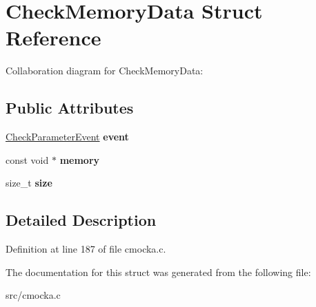 \hypertarget{structCheckMemoryData}{}\section{Check\+Memory\+Data Struct Reference}
\label{structCheckMemoryData}


Collaboration diagram for Check\+Memory\+Data\+:
\subsection*{Public Attributes}
\begin{DoxyCompactItemize}
\item 
\mbox{\label{structCheckMemoryData_afa102f599993f28924b9f73cf9b45990}} 
\hyperlink{structCheckParameterEvent}{Check\+Parameter\+Event} {\bfseries event}
\item 
\mbox{\label{structCheckMemoryData_aac7288cc682bfa7917c6258c56aeb723}} 
const void $\ast$ {\bfseries memory}
\item 
\mbox{\label{structCheckMemoryData_a0015b301a15e7b148e95aa1d6f51cb11}} 
size\+\_\+t {\bfseries size}
\end{DoxyCompactItemize}


\subsection{Detailed Description}


Definition at line 187 of file cmocka.\+c.



The documentation for this struct was generated from the following file\+:\begin{DoxyCompactItemize}
\item 
src/cmocka.\+c\end{DoxyCompactItemize}

